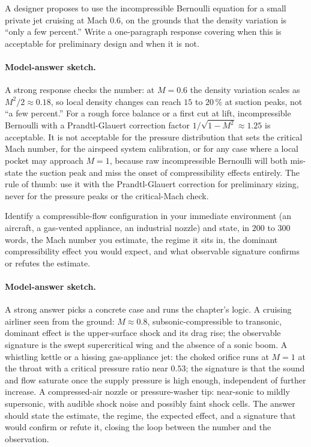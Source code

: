 \begin{exercise}
A designer proposes to use the incompressible Bernoulli equation
for a small private jet cruising at Mach $0.6$, on the grounds
that the density variation is ``only a few percent.'' Write a
one-paragraph response covering when this is acceptable for
preliminary design and when it is not.
\paragraph{Model-answer sketch.} A strong response checks the number:
at $M = 0.6$ the density variation scales as $M^2/2 \approx 0.18$, so
local density changes can reach $15$ to $20\,\%$ at suction peaks, not
``a few percent.'' For a rough force balance or a first cut at lift,
incompressible Bernoulli with a Prandtl-Glauert correction factor
$1/\sqrt{1 - M^2} \approx 1.25$ is acceptable. It is not acceptable
for the pressure distribution that sets the critical Mach number, for
the airspeed system calibration, or for any case where a local pocket
may approach $M = 1$, because raw incompressible Bernoulli will both
mis-state the suction peak and miss the onset of compressibility
effects entirely. The rule of thumb: use it with the Prandtl-Glauert
correction for preliminary sizing, never for the pressure peaks or the
critical-Mach check.
\end{exercise}

\begin{exercise}
Identify a compressible-flow configuration in your immediate
environment (an aircraft, a gas-vented appliance, an industrial
nozzle) and state, in $200$ to $300$ words, the Mach number you
estimate, the regime it sits in, the dominant compressibility
effect you would expect, and what observable signature confirms
or refutes the estimate.
\paragraph{Model-answer sketch.} A strong answer picks a concrete case
and runs the chapter's logic. A cruising airliner seen from the
ground: $M \approx 0.8$, subsonic-compressible to transonic, dominant
effect is the upper-surface shock and its drag rise; the observable
signature is the swept supercritical wing and the absence of a sonic
boom. A whistling kettle or a hissing gas-appliance jet: the choked
orifice runs at $M = 1$ at the throat with a critical pressure ratio
near $0.53$; the signature is that the sound and flow saturate once
the supply pressure is high enough, independent of further increase. A
compressed-air nozzle or pressure-washer tip: near-sonic to mildly
supersonic, with audible shock noise and possibly faint shock cells.
The answer should state the estimate, the regime, the expected effect,
and a signature that would confirm or refute it, closing the loop
between the number and the observation.
\end{exercise}

